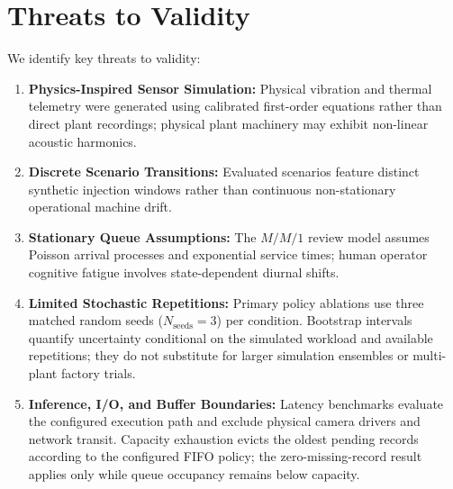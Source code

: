 \documentclass[conference]{IEEEtran}
\begin{document}
\section{Threats to Validity}
We identify key threats to validity:
\begin{enumerate}\setlength{\topsep}{1.5pt}\setlength{\itemsep}{0pt}\setlength{\parsep}{0pt}\setlength{\parskip}{0pt}
\item \textbf{Physics-Inspired Sensor Simulation:} Physical vibration and thermal telemetry were generated using calibrated first-order equations rather than direct plant recordings; physical plant machinery may exhibit non-linear acoustic harmonics.
    \item \textbf{Discrete Scenario Transitions:} Evaluated scenarios feature distinct synthetic injection windows rather than continuous non-stationary operational machine drift.
    \item \textbf{Stationary Queue Assumptions:} The $M/M/1$ review model assumes Poisson arrival processes and exponential service times; human operator cognitive fatigue involves state-dependent diurnal shifts.
    \item \textbf{Limited Stochastic Repetitions:} Primary policy ablations use three matched random seeds ($N_{\mathrm{seeds}} = 3$) per condition. Bootstrap intervals quantify uncertainty conditional on the simulated workload and available repetitions; they do not substitute for larger simulation ensembles or multi-plant factory trials.
    \item \textbf{Inference, I/O, and Buffer Boundaries:} Latency benchmarks evaluate the configured execution path and exclude physical camera drivers and network transit. Capacity exhaustion evicts the oldest pending records according to the configured FIFO policy; the zero-missing-record result applies only while queue occupancy remains below capacity.
\end{enumerate}

\end{document}
